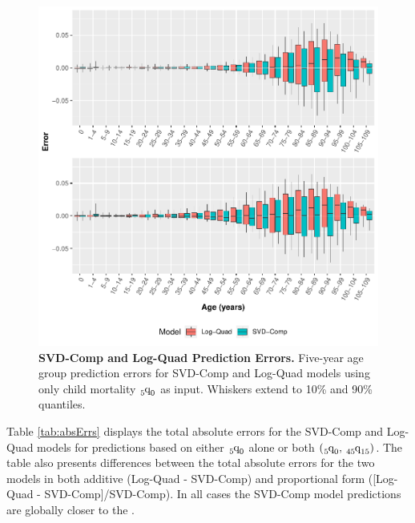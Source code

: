 \documentclass[11pt]{article}
\newcommand{\qf}{\tensor*[_5]{\mbox{q}}{_0}}
\newcommand{\qff}{\tensor*[_{45}]{\mbox{q}}{_{15}}}
\begin{document}
\begin{figure}[htbp]
   \centering
   \includegraphics[width=\linewidth]{../figures/fig3.pdf} 
   \captionsetup{format=plain,font=normalsize,margin=0cm,justification=justified}
   \caption{\textbf{SVD-Comp and Log-Quad Prediction Errors.}  Five-year age group prediction errors for SVD-Comp and Log-Quad models using only child mortality $\qf$ as input. Whiskers extend to 10\% and 90\% quantiles.}
   \label{fig:svdVsLqC}
\end{figure}

Table \ref{tab:absErrs} displays the total absolute errors  for the SVD-Comp and Log-Quad models for predictions based on either $\qf$  alone or both $\left(\qf, \, \qff \right)$.  The table also presents differences between the total absolute errors for the two models in both additive (Log-Quad - SVD-Comp) and proportional form ([Log-Quad - SVD-Comp]/SVD-Comp).  In all cases the SVD-Comp model predictions are globally closer to the .
\end{document}

